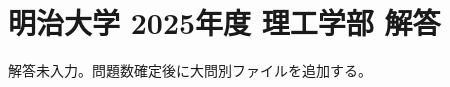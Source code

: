 \documentclass[../../uem_mat_mei_a.tex]{subfiles}
\begin{document}
    \section{明治大学 2025年度 理工学部 解答}

    解答未入力。問題数確定後に大問別ファイルを追加する。
\end{document}
